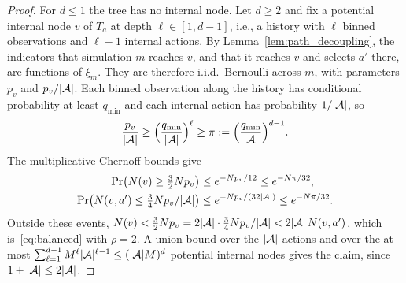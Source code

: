 \begin{proof}
For $d\le1$ the tree has no internal node.
Let $d\ge2$ and fix a potential internal node $v$ of $T_a$ at depth $\ell\in[1,d-1]$, i.e., a history with $\ell$ binned observations and $\ell-1$ internal actions.
By Lemma~\ref{lem:path_decoupling}, the indicators that simulation $m$ reaches $v$, and that it reaches $v$ and selects $a'$ there, are functions of $\xi_m$.
They are therefore i.i.d.\ Bernoulli across $m$, with parameters $p_v$ and $p_v/|{\mathcal{A}}|$.
Each binned observation along the history has conditional probability at least $q_{\min}$ and each internal action has probability $1/|{\mathcal{A}}|$, so
\[
\frac{p_v}{|{\mathcal{A}}|}\ge\Bigl(\frac{q_{\min}}{|{\mathcal{A}}|}\Bigr)^{\ell}\ge\pi:=\Bigl(\frac{q_{\min}}{|{\mathcal{A}}|}\Bigr)^{d-1}.
\]
The multiplicative Chernoff bounds give
\begin{align*}
\Pr\bigl(N(v)\ge\tfrac32Np_v\bigr)&\le e^{-Np_v/12}\le e^{-N\pi/32},\\
\Pr\bigl(N(v,a')\le\tfrac34Np_v/|{\mathcal{A}}|\bigr)&\le e^{-Np_v/(32|{\mathcal{A}}|)}\le e^{-N\pi/32}.
\end{align*}
Outside these events, $N(v)<\frac32Np_v=2|{\mathcal{A}}|\cdot\frac34Np_v/|{\mathcal{A}}|<2|{\mathcal{A}}|\,N(v,a')$, which is~\eqref{eq:balanced} with $\rho=2$.
A union bound over the $|{\mathcal{A}}|$ actions and over the at most $\sum_{\ell=1}^{d-1}M^\ell|{\mathcal{A}}|^{\ell-1}\le(|{\mathcal{A}}|M)^d$ potential internal nodes gives the claim, since $1+|{\mathcal{A}}|\le2|{\mathcal{A}}|$.
\end{proof}

